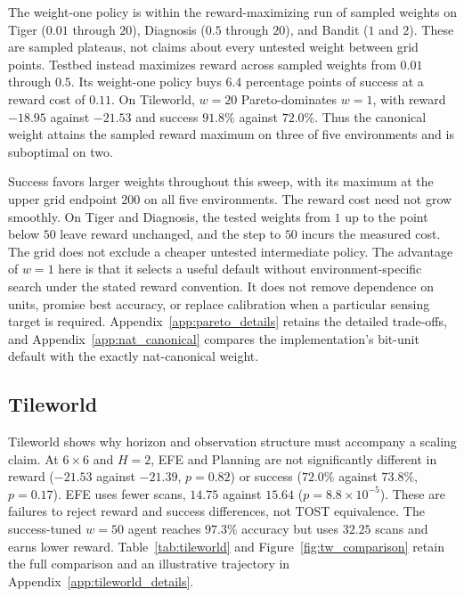 The weight-one policy is within the reward-maximizing run of sampled weights on Tiger ($0.01$ through $20$), Diagnosis ($0.5$ through $20$), and Bandit ($1$ and $2$). These are sampled plateaus, not claims about every untested weight between grid points. Testbed instead maximizes reward across sampled weights from $0.01$ through $0.5$. Its weight-one policy buys $6.4$ percentage points of success at a reward cost of $0.11$. On Tileworld, $w{=}20$ Pareto-dominates $w{=}1$, with reward $-18.95$ against $-21.53$ and success $91.8\%$ against $72.0\%$. Thus the canonical weight attains the sampled reward maximum on three of five environments and is suboptimal on two.

Success favors larger weights throughout this sweep, with its maximum at the upper grid endpoint $200$ on all five environments. The reward cost need not grow smoothly. On Tiger and Diagnosis, the tested weights from $1$ up to the point below $50$ leave reward unchanged, and the step to $50$ incurs the measured cost. The grid does not exclude a cheaper untested intermediate policy. The advantage of $w{=}1$ here is that it selects a useful default without environment-specific search under the stated reward convention. It does not remove dependence on units, promise best accuracy, or replace calibration when a particular sensing target is required. Appendix~\ref{app:pareto_details} retains the detailed trade-offs, and Appendix~\ref{app:nat_canonical} compares the implementation's bit-unit default with the exactly nat-canonical weight.

\subsection{Tileworld}
\label{sec:tileworld}

Tileworld shows why horizon and observation structure must accompany a scaling claim. At $6{\times}6$ and $H{=}2$, EFE and Planning are not significantly different in reward ($-21.53$ against $-21.39$, $p=0.82$) or success ($72.0\%$ against $73.8\%$, $p=0.17$). EFE uses fewer scans, $14.75$ against $15.64$ ($p=8.8{\times}10^{-5}$). These are failures to reject reward and success differences, not TOST equivalence. The success-tuned $w{=}50$ agent reaches $97.3\%$ accuracy but uses $32.25$ scans and earns lower reward. Table~\ref{tab:tileworld} and Figure~\ref{fig:tw_comparison} retain the full comparison and an illustrative trajectory in Appendix~\ref{app:tileworld_details}.

